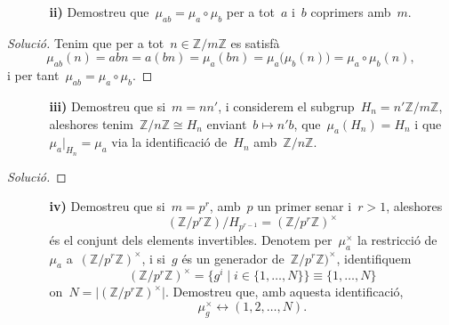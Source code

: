 \documentclass[a4paper]{article}
\newcommand{\ZZ}{\mathbb{Z}}
\newenvironment{solution}{
    \renewcommand\qedsymbol{\ensuremath{\lozenge}}
    \begin{proof}[Solució]
        }{
    \end{proof}
}
\begin{document}
\begin{enumerate}
    \item[] \begin{enumerate}
        \item[\textbf{ii)}] Demostreu que~\(\mu_{ab} = \mu_{a}\circ\mu_{b}\) per
            a tot~\(a\) i~\(b\) coprimers amb~\(m\).
    \end{enumerate}
\end{enumerate}

\begin{solution}
Tenim que per a tot~\(n\in\ZZ/m\ZZ\) es satisfà
\[
    \mu_{ab}(n)
    = abn
    = a(bn)
    = \mu_{a}(bn)
    = \mu_{a}\bigl(\mu_{b}(n)\bigr)
    = \mu_{a}\circ\mu_{b}(n),
\]
i per tant~\(\mu_{ab} = \mu_{a}\circ\mu_{b}\).
\end{solution}

\begin{enumerate}
    \item[] \begin{enumerate}
        \item[\textbf{iii)}] Demostreu que si~\(m=nn'\),
            i considerem el subgrup~\(H_{n}=n'\ZZ/m\ZZ\),
            aleshores tenim~\(\ZZ/n\ZZ \cong H_{n}\)
            enviant~\(b\mapsto n'b\),
            que~\(\mu_{a}(H_{n})=H_{n}\)
            i que~\(\mu_{a}\rvert_{H_{n}}=\mu_{a}\)
            via la identificació de~\(H_{n}\)
            amb~\(\ZZ/n\ZZ\).
    \end{enumerate}
\end{enumerate}

\begin{solution}
\end{solution}

\begin{enumerate}
    \item[] \begin{enumerate}
        \item[\textbf{iv)}] Demostreu que si~\(m=p^{r}\),
            amb~\(p\) un primer senar
            i~\(r>1\), aleshores
            \[
                (\ZZ/p^{r}\ZZ)/H_{p^{r-1}} = (\ZZ/p^{r}\ZZ)^{\times}
            \]
            és el conjunt dels elements invertibles.
            Denotem per~\(\mu_{a}^{\times}\)
            la restricció de~\(\mu_{a}\) a~\((\ZZ/p^{r}\ZZ)^{\times}\),
            i si~\(g\) és un generador de~\(\ZZ/p^{r}\ZZ)^{\times}\),
            identifiquem
            \[
                (\ZZ/p^{r}\ZZ)^{\times}
                =
                \{ g^{i} \mid i\in \{1,\dots,N\}\}
                \equiv
                \{1,\dots,N\}
            \]
            on~\(N = \lvert(\ZZ/p^{r}\ZZ)^{\times}\rvert\).
            Demostreu que, amb aquesta identificació,
            \[
                \mu_{g}^{\times} \leftrightarrow (1,2,\dots,N).
            \]
    \end{enumerate}
\end{enumerate}
\end{document}
